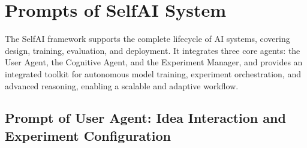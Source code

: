 \section{Prompts of SelfAI System}
\label{sec:supp_method}

The SelfAI framework supports the complete lifecycle of AI systems, covering design, training, evaluation, and deployment. It integrates three core agents: the User Agent, the Cognitive Agent, and the Experiment Manager, and provides an integrated toolkit for autonomous model training, experiment orchestration, and advanced reasoning, enabling a scalable and adaptive workflow.

\subsection{Prompt of User Agent: Idea Interaction and Experiment Configuration}
\label{sec:supp_user_agent}

